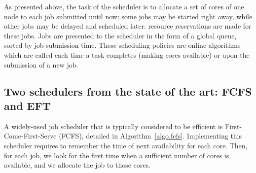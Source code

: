 \documentclass[conference,10pt]{IEEEtran}
\begin{document}
As presented above, the task of the scheduler is to allocate a set of
cores of one node
to each job submitted until now: some jobs may be started right away,
while other jobs may be delayed and scheduled later: resource
reservations are made for these jobs. Jobs are presented to the
scheduler in the form of a global queue, sorted by job submission
time. These scheduling policies are online algorithms which are called each time
a task completes (making cores available) or upon the submission of
a new job.






\subsection{Two schedulers from the state of the art: FCFS and EFT}\label{subsec.fcfs_eft}

A widely-used job scheduler that is typically considered to be efficient is
First-Come-First-Serve (FCFS), detailed in
Algorithm~\ref{algo.fcfs}. Implementing this scheduler requires to
remember the time of next availability for each core. Then, for each job, we look
for the first time when a sufficient number of cores is available, and we allocate the job to
those cores.
\end{document}
